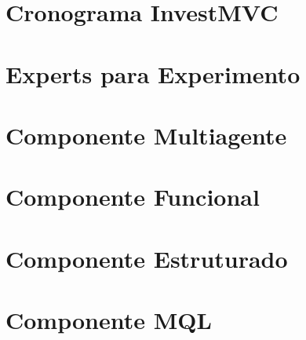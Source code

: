 \begin{apendicesenv}

\partapendices

\chapter{Cronograma InvestMVC}


\chapter{Experts para Experimento}


\chapter{Componente Multiagente}
%

\chapter{Componente Funcional}


\chapter{Componente Estruturado}


\chapter{Componente MQL}

\end{apendicesenv}